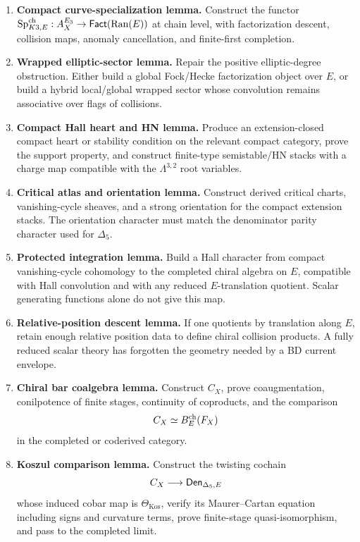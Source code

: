 \begin{enumerate}
\item \textbf{Compact curve-specialization lemma.}
Construct the functor
\(\mathrm{Sp}^{\mathrm{ch}}_{K3,E}:A_X^{E_3}\to\mathsf{Fact}(\operatorname{Ran}(E))\) at chain level, with
factorization descent, collision maps, anomaly cancellation, and
finite-first completion.

\item \textbf{Wrapped elliptic-sector lemma.}
Repair the positive elliptic-degree obstruction.  Either build a global
Fock/Hecke factorization object over \(E\), or build a hybrid
local/global wrapped sector whose convolution remains associative over
flags of collisions.

\item \textbf{Compact Hall heart and HN lemma.}
Produce an extension-closed compact heart or stability condition on the
relevant compact category, prove the support property, and construct
finite-type semistable/HN stacks with a charge map compatible with the
\(\Lambda^{3,2}\) root variables.

\item \textbf{Critical atlas and orientation lemma.}
Construct derived critical charts, vanishing-cycle sheaves, and a
strong orientation for the compact extension stacks.  The orientation
character must match the denominator parity character used for
\(\Delta_5\).

\item \textbf{Protected integration lemma.}
Build a Hall character from compact vanishing-cycle cohomology to the
completed chiral algebra on \(E\), compatible with Hall convolution and
with any reduced \(E\)-translation quotient.  Scalar generating
functions alone do not give this map.

\item \textbf{Relative-position descent lemma.}
If one quotients by translation along \(E\), retain enough relative
position data to define chiral collision products.  A fully reduced
scalar theory has forgotten the geometry needed by a BD current
envelope.

\item \textbf{Chiral bar coalgebra lemma.}
Construct \(C_X\), prove coaugmentation, conilpotence of finite stages,
continuity of coproducts, and the comparison
\[
        C_X\simeq B^{\mathrm{ch}}_E(F_X)
\]
in the completed or coderived category.

\item \textbf{Koszul comparison lemma.}
Construct the twisting cochain
\[
        C_X\longrightarrow \mathsf{Den}_{\Delta_5,E}
\]
whose induced cobar map is \(\Theta_{\mathrm{Kos}}\), verify its
Maurer--Cartan equation including signs and curvature terms, prove
finite-stage quasi-isomorphism, and pass to the completed limit.


\end{enumerate}
